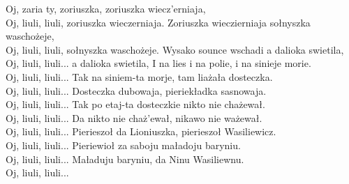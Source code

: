 \begin{flushleft}
\hops
Oj, zaria ty, zoriuszka, zoriuszka wiecz'erniaja,\\
Oj, liuli, liuli, zoriuszka wieczerniaja.
\hops
Zoriuszka wieczierniaja sołnyszka waschożeje,\\
Oj, liuli, liuli, sołnyszka waschożeje.
\hops
Wysako sounce wschadi a dalioka swietila,\\
Oj, liuli, liuli... a dalioka swietila,
\hops
I na lies i na polie, i na sinieje morie.\\
Oj, liuli, liuli...\hops
Tak na siniem-ta morje, tam liażała dosteczka.\\
Oj, liuli, liuli...
\hops
Dosteczka dubowaja, pieriekładka sasnowaja.\\
Oj, liuli, liuli...\hops
Tak po etaj-ta dosteczkie nikto nie chażewał.\\
Oj, liuli, liuli...
\hops
Da nikto nie chaż'ewał, nikawo nie ważewał.\\
Oj, liuli, liuli...
\hops
Pierieszoł da Lioniuszka, pierieszoł Wasiliewicz.\\
Oj, liuli, liuli...\hops
Pieriewioł za saboju maładoju baryniu.\\
Oj, liuli, liuli...\hops
Maładuju baryniu, da Ninu Wasiliewnu.\\
Oj, liuli, liuli...
\end{flushleft}
\newpage